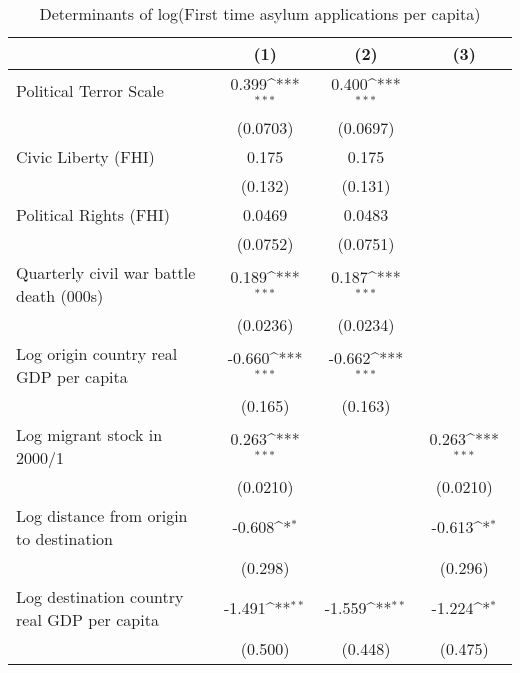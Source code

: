 \begin{table}[htbp]\centering
\def\sym#1{\ifmmode^{#1}\else\(^{#1}\)\fi}
\caption{Determinants of log(First time asylum applications per capita)}
\begin{tabular}{l*{3}{c}}
\hline\hline
                    &\multicolumn{1}{c}{(1)}         &\multicolumn{1}{c}{(2)}         &\multicolumn{1}{c}{(3)}         \\
\hline
Political Terror Scale&       0.399\sym{***}&       0.400\sym{***}&                     \\
                    &    (0.0703)         &    (0.0697)         &                     \\
[1em]
Civic Liberty (FHI) &       0.175         &       0.175         &                     \\
                    &     (0.132)         &     (0.131)         &                     \\
[1em]
Political Rights (FHI)&      0.0469         &      0.0483         &                     \\
                    &    (0.0752)         &    (0.0751)         &                     \\
[1em]
Quarterly civil war battle death (000s)&       0.189\sym{***}&       0.187\sym{***}&                     \\
                    &    (0.0236)         &    (0.0234)         &                     \\
[1em]
Log origin country real GDP per capita&      -0.660\sym{***}&      -0.662\sym{***}&                     \\
                    &     (0.165)         &     (0.163)         &                     \\
[1em]
Log migrant stock in 2000/1&       0.263\sym{***}&                     &       0.263\sym{***}\\
                    &    (0.0210)         &                     &    (0.0210)         \\
[1em]
Log distance from origin to destination&      -0.608\sym{*}  &                     &      -0.613\sym{*}  \\
                    &     (0.298)         &                     &     (0.296)         \\
[1em]
Log destination country real GDP per capita&      -1.491\sym{**} &      -1.559\sym{**} &      -1.224\sym{*}  \\
                    &     (0.500)         &     (0.448)         &     (0.475)         \\

\end{tabular}
\end{table}
